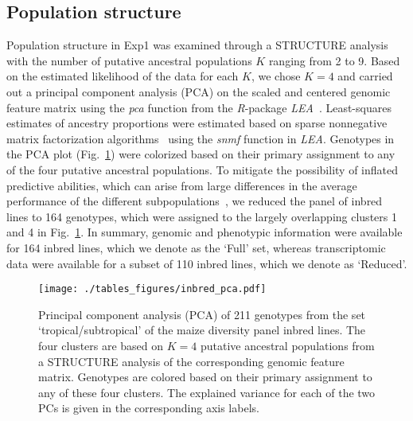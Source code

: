 \documentclass[12pt,titlepage]{article}
\begin{document}
\subsection{Population structure}
Population structure in Exp1 was examined through a STRUCTURE
\cite{Pritchard2000} analysis with the number of putative ancestral
populations $K$ ranging from 2 to 9.
Based on the estimated likelihood of the data for each $K$, we chose $K=4$
and carried out a principal component analysis (PCA) on the scaled and centered
genomic feature matrix using the \emph{pca} function from the \emph{R}-package
\emph{LEA}~\cite{Frichot2015}.
Least-squares estimates of ancestry proportions were estimated based on sparse 
nonnegative matrix factorization algorithms~\cite{Frichot2014} using the 
\emph{snmf} function in \emph{LEA}.
Genotypes in the PCA plot (Fig.~\ref{fig:inbred-pca}) were colorized based on their
primary assignment to any of the four putative ancestral populations.
To mitigate the possibility of inflated predictive abilities, which can arise
from large differences in the average performance of the different
subpopulations~\cite{Windhausen2012}, we reduced the panel of inbred lines to
164 genotypes, which were assigned to the largely overlapping clusters 1 and 4 in
Fig.~\ref{fig:inbred-pca}.
In summary, genomic and phenotypic information were available for 164 inbred
lines, which we denote as the `Full' set, whereas transcriptomic data were
available for a subset of 110 inbred lines, which we denote as `Reduced'.

\begin{figure}[H]
  \centering
  \texttt{[image: ./tables\_figures/inbred\_pca.pdf]}
  \caption{
  Principal component analysis (PCA) of 211 genotypes from the set
  `tropical/subtropical' of the maize diversity panel inbred lines.
  The four clusters are based on $K=4$ putative ancestral populations from a
  STRUCTURE analysis of the corresponding genomic feature matrix.
  Genotypes are colored based on their primary assignment to any of these four
  clusters.
  The explained variance for each of the two PCs is given in the corresponding
  axis labels.
}
\label{fig:inbred-pca}
\end{figure}
\end{document}
